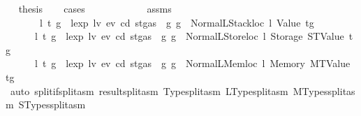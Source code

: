 \begin{isabellebody}
\ \isamarkupfalse%
\ {\isacharquery}{\kern0pt}thesis\isanewline
\ \ \isamarkupfalse%
\ cases\isanewline
\ \ \ \ \isamarkupfalse%
\ {}\isanewline
\ \ \ \ \isamarkupfalse%
\ assms\ \isamarkupfalse%
\isanewline
\ \ \ \ \ \ {\isacharparenleft}{\kern0pt}{}{}{\isacharparenright}{\kern0pt}\ l\ t{\isacharprime}{\kern0pt}\ g{\isacharprime}{\kern0pt}\ \ {\isachardoublequoteopen}lexp\ lv\ ev\ cd\ {\isacharparenleft}{\kern0pt}st{\isasymlparr}gas\ {\isacharcolon}{\kern0pt}{\isacharequal}{\kern0pt}\ g{\isasymrparr}{\isacharparenright}{\kern0pt}\ g\ {\isacharequal}{\kern0pt}\ Normal{\isacharparenleft}{\kern0pt}{\isacharparenleft}{\kern0pt}LStackloc\ l{\isacharcomma}{\kern0pt}\ Value\ t{\isacharprime}{\kern0pt}{\isacharparenright}{\kern0pt}{\isacharcomma}{\kern0pt}g{\isacharprime}{\kern0pt}{\isacharparenright}{\kern0pt}{\isachardoublequoteclose}\isanewline
\ \ \ \ {\isacharbar}{\kern0pt}\ {\isacharparenleft}{\kern0pt}{}{}{\isacharparenright}{\kern0pt}\ l\ t{\isacharprime}{\kern0pt}\ g{\isacharprime}{\kern0pt}\ \ {\isachardoublequoteopen}lexp\ lv\ ev\ cd\ {\isacharparenleft}{\kern0pt}st{\isasymlparr}gas\ {\isacharcolon}{\kern0pt}{\isacharequal}{\kern0pt}\ g{\isasymrparr}{\isacharparenright}{\kern0pt}\ g\ {\isacharequal}{\kern0pt}\ Normal{\isacharparenleft}{\kern0pt}{\isacharparenleft}{\kern0pt}LStoreloc\ l{\isacharcomma}{\kern0pt}\ Storage\ {\isacharparenleft}{\kern0pt}STValue\ t{\isacharprime}{\kern0pt}{\isacharparenright}{\kern0pt}{\isacharparenright}{\kern0pt}{\isacharcomma}{\kern0pt}g{\isacharprime}{\kern0pt}{\isacharparenright}{\kern0pt}{\isachardoublequoteclose}\isanewline
\ \ \ \ {\isacharbar}{\kern0pt}\ {\isacharparenleft}{\kern0pt}{}{}{\isacharparenright}{\kern0pt}\ l\ t{\isacharprime}{\kern0pt}\ g{\isacharprime}{\kern0pt}\ \ {\isachardoublequoteopen}lexp\ lv\ ev\ cd\ {\isacharparenleft}{\kern0pt}st{\isasymlparr}gas\ {\isacharcolon}{\kern0pt}{\isacharequal}{\kern0pt}\ g{\isasymrparr}{\isacharparenright}{\kern0pt}\ g\ {\isacharequal}{\kern0pt}\ Normal{\isacharparenleft}{\kern0pt}{\isacharparenleft}{\kern0pt}LMemloc\ l{\isacharcomma}{\kern0pt}\ Memory\ {\isacharparenleft}{\kern0pt}MTValue\ t{\isacharprime}{\kern0pt}{\isacharparenright}{\kern0pt}{\isacharparenright}{\kern0pt}{\isacharcomma}{\kern0pt}g{\isacharprime}{\kern0pt}{\isacharparenright}{\kern0pt}{\isachardoublequoteclose}\isanewline
\ \ \ \ \ \ \isamarkupfalse%
\ {\isacharparenleft}{\kern0pt}auto\ split{\isacharcolon}{\kern0pt}if{\isacharunderscore}{\kern0pt}split{\isacharunderscore}{\kern0pt}asm\ result{\isachardot}{\kern0pt}split{\isacharunderscore}{\kern0pt}asm\ Type{\isachardot}{\kern0pt}split{\isacharunderscore}{\kern0pt}asm\ LType{\isachardot}{\kern0pt}split{\isacharunderscore}{\kern0pt}asm\ MTypes{\isachardot}{\kern0pt}split{\isacharunderscore}{\kern0pt}asm\ STypes{\isachardot}{\kern0pt}split{\isacharunderscore}{\kern0pt}asm{\isacharparenright}{\kern0pt}\isanewline

\end{isabellebody}
